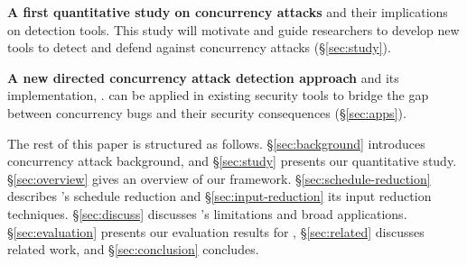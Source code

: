 \begin{tightenum}

\item \textbf{A first quantitative study on concurrency attacks} and their 
implications on detection tools. This study will motivate and guide researchers 
to develop new tools to detect and defend against concurrency 
attacks (\S\ref{sec:study}).

\item \textbf{A new directed concurrency attack detection approach} and its 
implementation, \xxx. \xxx can be applied in existing security tools to bridge 
the gap between concurrency bugs and their security consequences 
(\S\ref{sec:apps}).

\end{tightenum}

The rest of this paper is structured as follows.  \S\ref{sec:background} 
introduces concurrency attack background, and \S\ref{sec:study} 
presents our quantitative study. \S\ref{sec:overview} 
gives an overview of our \xxx framework. \S\ref{sec:schedule-reduction} 
describes \xxx's schedule reduction 
and \S\ref{sec:input-reduction} its input reduction techniques. 
\S\ref{sec:discuss} discusses \xxx's limitations and broad applications. 
\S\ref{sec:evaluation} presents our evaluation results for \xxx, 
\S\ref{sec:related} discusses related work, and \S\ref{sec:conclusion}
concludes. 




